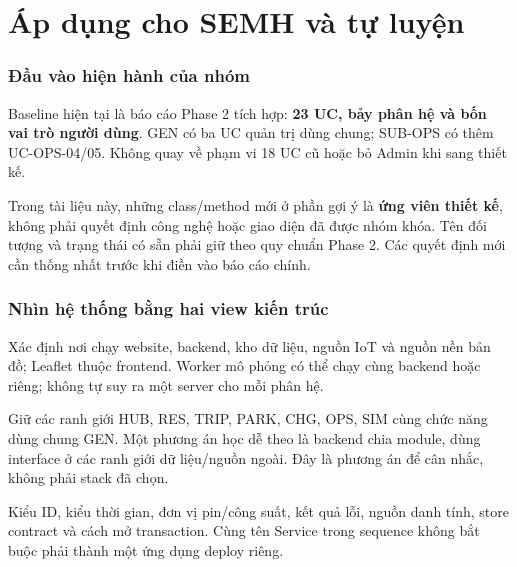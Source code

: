\chapter{Áp dụng cho SEMH và tự luyện}
\subsection{Đầu vào hiện hành của nhóm}
Baseline hiện tại là báo cáo Phase 2 tích hợp: \textbf{23 UC, bảy phân hệ và bốn vai trò người dùng}. GEN có ba UC quản trị dùng chung; SUB-OPS có thêm UC-OPS-04/05. Không quay về phạm vi 18 UC cũ hoặc bỏ Admin khi sang thiết kế.

Trong tài liệu này, những class/method mới ở phần gợi ý là \textbf{ứng viên thiết kế}, không phải quyết định công nghệ hoặc giao diện đã được nhóm khóa. Tên đối tượng và trạng thái có sẵn phải giữ theo quy chuẩn Phase 2. Các quyết định mới cần thống nhất trước khi điền vào báo cáo chính.

\subsection{Nhìn hệ thống bằng hai view kiến trúc}
Xác định nơi chạy website, backend, kho dữ liệu, nguồn IoT và nguồn nền bản đồ; Leaflet thuộc frontend. Worker mô phỏng có thể chạy cùng backend hoặc riêng; không tự suy ra một server cho mỗi phân hệ.

Giữ các ranh giới HUB, RES, TRIP, PARK, CHG, OPS, SIM cùng chức năng dùng chung GEN. Một phương án học dễ theo là backend chia module, dùng interface ở các ranh giới dữ liệu/nguồn ngoài. Đây là phương án để cân nhắc, không phải stack đã chọn.

Kiểu ID, kiểu thời gian, đơn vị pin/công suất, kết quả lỗi, nguồn danh tính, store contract và cách mở transaction. Cùng tên Service trong sequence không bắt buộc phải thành một ứng dụng deploy riêng.

